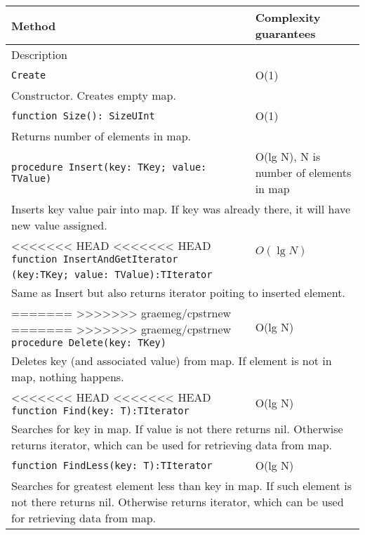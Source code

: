 \begin{longtable}{|m{10cm}|m{5cm}|}
\hline
Method & Complexity guarantees \\ \hline
\multicolumn{2}{|m{15cm}|}{Description} \\ \hline\hline

\verb!Create! & O(1) \\ \hline
\multicolumn{2}{|m{15cm}|}{Constructor. Creates empty map.} \\ \hline\hline

\verb!function Size(): SizeUInt! & O(1) \\ \hline
\multicolumn{2}{|m{15cm}|}{Returns number of elements in map.} \\\hline\hline

\verb!procedure Insert(key: TKey; value: TValue)! &
O(lg N), N is number of elements in map \\ \hline
\multicolumn{2}{|m{15cm}|}{Inserts key value pair into map. If key was already there, it will have
new value assigned.} \\\hline\hline

<<<<<<< HEAD
<<<<<<< HEAD
\verb!function InsertAndGetIterator! & $O(\lg N)$\\
\verb!(key:TKey; value: TValue):TIterator! & \\ \hline
\multicolumn{2}{|m{15cm}|}{Same as Insert but also returns iterator poiting to inserted element.} \\\hline\hline

=======
>>>>>>> graemeg/cpstrnew
=======
>>>>>>> graemeg/cpstrnew
\verb!procedure Delete(key: TKey)! &
O(lg N) \\ \hline
\multicolumn{2}{|m{15cm}|}{Deletes key (and associated value) from map. If element is not in map, nothing happens.} \\\hline\hline

<<<<<<< HEAD
<<<<<<< HEAD
\verb!function Find(key: T):TIterator! & O(lg N) \\\hline
\multicolumn{2}{|m{15cm}|}{Searches for key in map. If value is not there returns nil. Otherwise
returns iterator, which can be used for retrieving data from map.} \\\hline\hline

\verb!function FindLess(key: T):TIterator! & O(lg N) \\\hline
\multicolumn{2}{|m{15cm}|}{Searches for greatest element less than key in map. If such element is not there returns nil. Otherwise
returns iterator, which can be used for retrieving data from map.} \\\hline\hline


\end{longtable}
